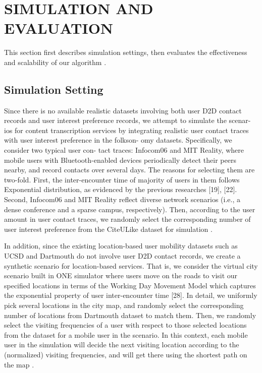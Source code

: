 \documentclass[10pt,journal,compsoc]{IEEEtran}
\begin{document}
\section{SIMULATION AND EVALUATION}

This section first describes simulation settings, then evaluates the effectiveness and scalability of our algorithm \cite{Wu2016}.

\subsection{Simulation Setting}
Since there is no available realistic datasets involving both user D2D contact records and user interest preference records, we attempt to simulate the scenar- ios for content transcription services by integrating realistic user contact traces with user interest preference in the folkson- omy datasets. Specifically, we consider two typical user con- tact traces: Infocom06 and MIT Reality, where mobile users with Bluetooth-enabled devices periodically detect their peers nearby, and record contacts over several days. The reasons for selecting them are two-fold. First, the inter-encounter time of majority of users in them follows Exponential distribution, as evidenced by the previous researches [19], [22]. Second, Infocom06 and MIT Reality reflect diverse network scenarios (i.e., a dense conference and a sparse campus, respectively). Then, according to the user amount in user contact traces, we randomly select the corresponding number of user interest preference from the CiteULike dataset for simulation \cite{Pu2017}.

In addition, since the existing location-based user mobility datasets such as UCSD and Dartmouth do not involve user D2D contact records, we create a synthetic scenario for location-based services. That is, we consider the virtual city scenario built in ONE simulator where users move on the roads to visit our specified locations in terms of the Working Day Movement Model which captures the exponential property of user inter-encounter time [28]. In detail, we uniformly pick several locations in the city map, and randomly select the corresponding number of locations from Dartmouth dataset to match them. Then, we randomly select the visiting frequencies of a user with respect to those selected locations from the dataset for a mobile user in the scenario. In this context, each mobile user in the simulation will decide the next visiting location according to the (normalized) visiting frequencies, and will get there using the shortest path on the map \cite{Deng2017}.
\end{document}

